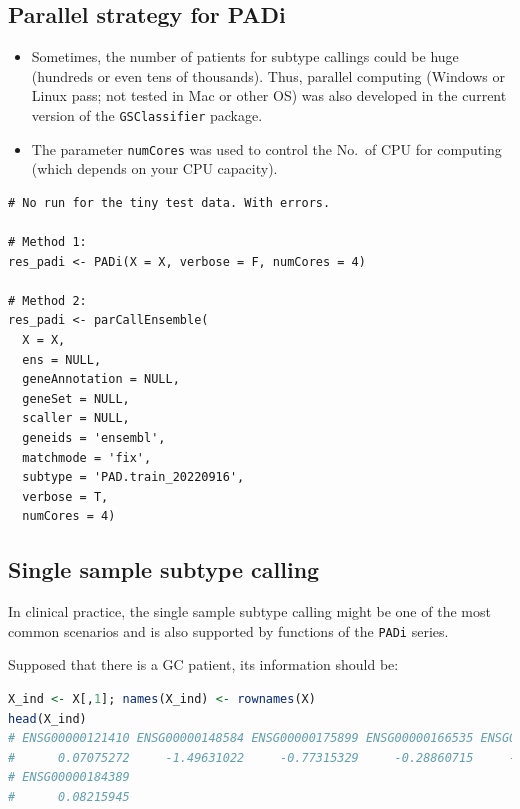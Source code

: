 \documentclass[
  12pt,
]{book}
\newcommand{\passthrough}[1]{#1}
\begin{document}
\hypertarget{parallel-strategy-for-padi}{%
\subsection{Parallel strategy for PADi}\label{parallel-strategy-for-padi}}

\begin{itemize}
\item
  Sometimes, the number of patients for subtype callings could be huge (hundreds or even tens of thousands). Thus, parallel computing (Windows or Linux pass; not tested in Mac or other OS) was also developed in the current version of the \passthrough{\lstinline!GSClassifier!} package.
\item
  The parameter \passthrough{\lstinline!numCores!} was used to control the No.~of CPU for computing (which depends on your CPU capacity).
\end{itemize}

\begin{lstlisting}
# No run for the tiny test data. With errors.

# Method 1:
res_padi <- PADi(X = X, verbose = F, numCores = 4)

# Method 2: 
res_padi <- parCallEnsemble(
  X = X,
  ens = NULL,
  geneAnnotation = NULL,
  geneSet = NULL,
  scaller = NULL,
  geneids = 'ensembl',
  matchmode = 'fix',
  subtype = 'PAD.train_20220916',
  verbose = T,
  numCores = 4)
\end{lstlisting}

\hypertarget{single-sample-subtype-calling}{%
\subsection{Single sample subtype calling}\label{single-sample-subtype-calling}}

In clinical practice, the single sample subtype calling might be one of the most common scenarios and is also supported by functions of the \passthrough{\lstinline!PADi!} series.

Supposed that there is a GC patient, its information should be:

\begin{lstlisting}[language=R]
X_ind <- X[,1]; names(X_ind) <- rownames(X)
head(X_ind)
# ENSG00000121410 ENSG00000148584 ENSG00000175899 ENSG00000166535 ENSG00000256069 
#      0.07075272     -1.49631022     -0.77315329     -0.28860715     -0.25034243 
# ENSG00000184389 
#      0.08215945
\end{lstlisting}
\end{document}
